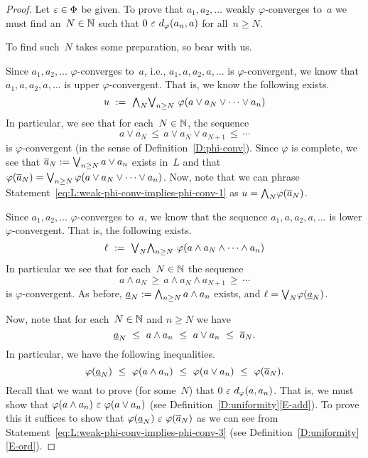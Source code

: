 \documentclass[main.tex]{subfiles}
\begin{document}
\begin{proof}
Let $\varepsilon \in \Phi$ be given.
To prove that $a_1,a_2,\dotsc$ weakly $\varphi$-converges to~$a$
we must find an~$N\in \mathbb{N}$ such that
$0 \ \varepsilon\ d_{\smash{\varphi}}(a_n,a)$ for all~$n\geq N$.

To find such~$N$ takes some preparation,
so bear with us.

Since $a_1,a_2,\dotsc$  $\varphi$-converges to~$a$,
i.e., $a_1,a,a_2,a,\dotsc$ is $\varphi$-convergent,
we know that $a_1,a,a_2,a,\dotsc$ is upper $\varphi$-convergent.
That is, we know the following exists.
\begin{equation}
\label{eq:L:weak-phi-conv-implies-phi-conv-1}
u\ \eqdf \ 
\bw_N \bv_{n\geq N}\  \varphi(a\vee a_N\vee \dotsb \vee a_n)
\end{equation}
In particular,
we see that for each~$N\in \mathbb{N}$,
the sequence 
\begin{equation*}
a\vee a_N \,\leq\, a\vee a_N\vee a_{N+1}\,\leq\,\dotsb
\end{equation*}
is $\varphi$-convergent
(in the sense of Definition~\ref{D:phi-conv}).
Since $\varphi$ is complete,
we see that $\overline{a}_N := \textstyle{\bigvee}_{n\geq N} \, a \vee a_n$ exists in~$L$
and that $\varphi(\overline{a}_N) 
= \textstyle{\bigvee}_{n \geq N} \,\varphi(a \vee a_N \vee\dotsb \vee a_n)$.
Now, note that we
 can phrase Statement~\eqref{eq:L:weak-phi-conv-implies-phi-conv-1}
as $u = \textstyle{\bigwedge}_N \varphi(\overline{a}_N)$.

Since $a_1,a_2,\dotsc$ $\varphi$-converges to~$a$,
we know that the sequence $a_1,a,a_2,a,\dotsc$ is
lower $\varphi$-convergent. That is, the following exists.
\begin{equation}
\label{eq:L:weak-phi-conv-implies-phi-conv-2}
\ell\ \eqdf \ 
\bv_N \bw_{n\geq N}\  \varphi(a\wedge a_N\wedge \dotsb \wedge a_n)
\end{equation}
In particular we see that for each~$N\in\mathbb{N}$ the sequence
\begin{equation*}
a\wedge a_N \,\geq\, a\wedge a_N\wedge a_{N+1}\,\geq\,\dotsb
\end{equation*}
is $\varphi$-convergent.
As before, $\underline{a}_N := \textstyle{\bigwedge}_{n\geq N}\, a\wedge a_n$ exists,
and $\ell = \textstyle{\bigvee}_N \varphi(\underline{a}_N)$.

Now, note that for each~$N\in \mathbb{N}$ and $n\geq N$ we have
\begin{equation*}
\ul{a}_N \ \leq\ a\wedge a_n  \ \leq\ a\vee a_n  \ \leq\ \ol{a}_N.
\end{equation*}
In particular, we have the following inequalities.
\begin{equation}
\label{eq:L:weak-phi-conv-implies-phi-conv-3}
\varphi(\underline{a}_N) \ \leq\ \varphi(a\wedge a_n)  
\ \leq\ \varphi(a\vee a_n)  \ \leq\ \varphi(\overline{a}_N).
\end{equation}
Recall that we want to prove (for some~$N$) that
$0 \ \varepsilon\ d_{\smash{\varphi}}(a,a_n)$.
That is, we must show that $\varphi(a\wedge a_n) \ \ve\ \varphi(a\vee a_n)$
(see Definition~\ref{D:uniformity}\ref{E-add}).
To prove this it suffices to show 
that $\varphi(\underline{a}_N) \ \varepsilon\ \varphi(\overline{a}_N)$
as we can see from Statement~\eqref{eq:L:weak-phi-conv-implies-phi-conv-3}
(see  Definition~\ref{D:uniformity}\ref{E-ord}).


\end{proof}
\end{document}
